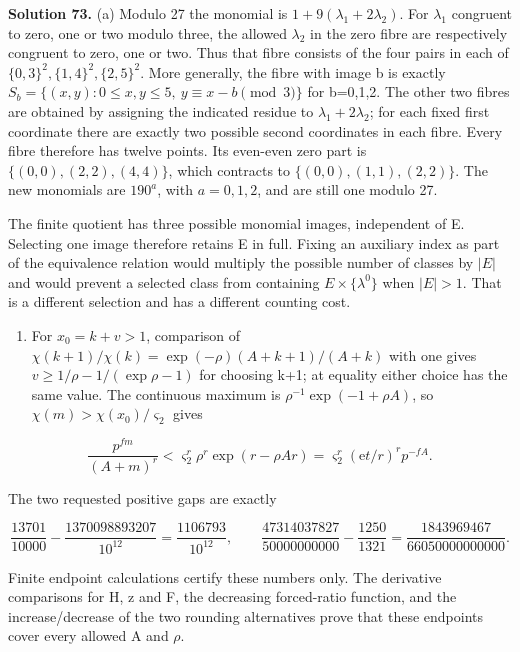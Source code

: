 \documentclass[
  11pt,
  a4paper,
]{article}
\providecommand{\tightlist}{%
  \setlength{\itemsep}{0pt}\setlength{\parskip}{0pt}}
\begin{document}
\textbf{Solution 73.} (a) Modulo 27 the monomial is
\(1+9(\lambda_1+2\lambda_2)\). For \(\lambda_1\) congruent to zero, one
or two modulo three, the allowed \(\lambda_2\) in the zero fibre are
respectively congruent to zero, one or two. Thus that fibre consists of
the four pairs in each of \(\{0,3\}^2,\{1,4\}^2,\{2,5\}^2\). More
generally, the fibre with image b is exactly
\(S_b=\{(x,y):0\le x,y\le5,\ y\equiv x-b\pmod3\}\) for b=0,1,2. The
other two fibres are obtained by assigning the indicated residue to
\(\lambda_1+2\lambda_2\); for each fixed first coordinate there are
exactly two possible second coordinates in each fibre. Every fibre
therefore has twelve points. Its even-even zero part is
\(\{(0,0),(2,2),(4,4)\}\), which contracts to \(\{(0,0),(1,1),(2,2)\}\).
The new monomials are \(190^a\), with \(a=0,1,2\), and are still one
modulo 27.

The finite quotient has three possible monomial images, independent of
E. Selecting one image therefore retains E in full. Fixing an auxiliary
index as part of the equivalence relation would multiply the possible
number of classes by \(|E|\) and would prevent a selected class from
containing \(E\times\{\lambda^0\}\) when \(|E|>1\). That is a different
selection and has a different counting cost.

\begin{enumerate}
\def\labelenumi{(\alph{enumi})}
\setcounter{enumi}{1}
\tightlist
\item
  For \(x_0=k+v>1\), comparison of
  \(\chi(k+1)/\chi(k)=\exp(-\rho)(A+k+1)/(A+k)\) with one gives
  \(v\ge1/\rho-1/(\exp\rho-1)\) for choosing k+1; at equality either
  choice has the same value. The continuous maximum is
  \(\rho^{-1}\exp(-1+\rho A)\), so \(\chi(m)>\chi(x_0)/\varsigma_2\)
  gives
\end{enumerate}

\[
\frac{p^{fm}}{(A+m)^r}
<\varsigma_2^r\rho^r\exp(r-\rho Ar)
=\varsigma_2^r(\mathrm e t/r)^r p^{-fA}.
\tag{10.678}
\]

The two requested positive gaps are exactly

\[
\frac{13701}{10000}-\frac{1370098893207}{10^{12}}
=\frac{1106793}{10^{12}},\qquad
\frac{47314037827}{50000000000}-\frac{1250}{1321}
=\frac{1843969467}{66050000000000}.
\tag{10.679}
\]

Finite endpoint calculations certify these numbers only. The derivative
comparisons for H, z and F, the decreasing forced-ratio function, and
the increase/decrease of the two rounding alternatives prove that these
endpoints cover every allowed A and \(\rho\).
\end{document}

